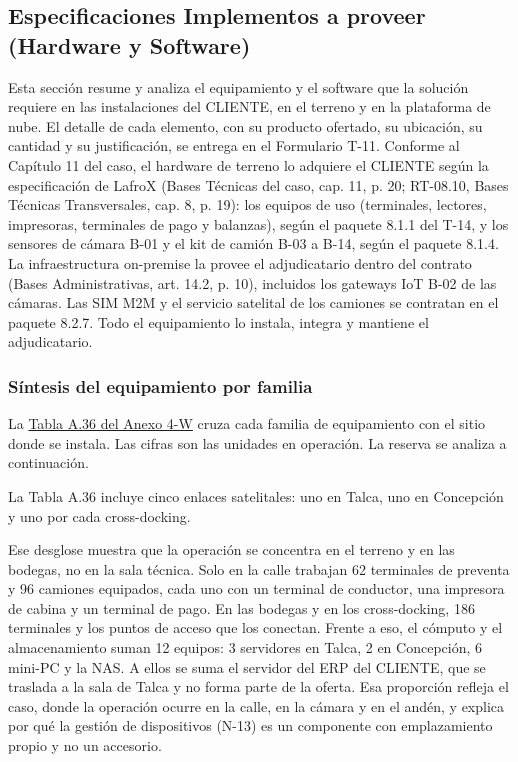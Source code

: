%

\subsection{Especificaciones Implementos a proveer (Hardware y Software)}
\label{sec:implementos}

Esta sección resume y analiza el equipamiento y el software que la solución requiere en las instalaciones del CLIENTE, en el terreno y en la plataforma de nube. El detalle de cada elemento, con su producto ofertado, su ubicación, su cantidad y su justificación, se entrega en el Formulario T-11. Conforme al Capítulo 11 del caso, el hardware de terreno lo adquiere el CLIENTE según la especificación de LafroX (Bases Técnicas del caso, cap. 11, p. 20; RT-08.10, Bases Técnicas Transversales, cap. 8, p. 19): los equipos de uso (terminales, lectores, impresoras, terminales de pago y balanzas), según el paquete 8.1.1 del T-14, y los sensores de cámara B-01 y el kit de camión B-03 a B-14, según el paquete 8.1.4. La infraestructura on-premise la provee el adjudicatario dentro del contrato (Bases Administrativas, art. 14.2, p. 10), incluidos los gateways IoT B-02 de las cámaras. Las SIM M2M y el servicio satelital de los camiones se contratan en el paquete 8.2.7. Todo el equipamiento lo instala, integra y mantiene el adjudicatario.

\subsubsection{Síntesis del equipamiento por familia}

La \href{LAFROX-Subdocumento4-Anexos.pdf#tab:t26}{Tabla A.36 del Anexo 4-W} cruza cada familia de equipamiento con el sitio donde se instala. Las cifras son las unidades en operación. La reserva se analiza a continuación.



La Tabla A.36 incluye cinco enlaces satelitales: uno en Talca, uno en Concepción y uno por cada cross-docking.

Ese desglose muestra que la operación se concentra en el terreno y en las bodegas, no en la sala técnica. Solo en la calle trabajan 62 terminales de preventa y 96 camiones equipados, cada uno con un terminal de conductor, una impresora de cabina y un terminal de pago. En las bodegas y en los cross-docking, 186 terminales y los puntos de acceso que los conectan. Frente a eso, el cómputo y el almacenamiento suman 12 equipos: 3 servidores en Talca, 2 en Concepción, 6 mini-PC y la NAS. A ellos se suma el servidor del ERP del CLIENTE, que se traslada a la sala de Talca y no forma parte de la oferta. Esa proporción refleja el caso, donde la operación ocurre en la calle, en la cámara y en el andén, y explica por qué la gestión de dispositivos (N-13) es un componente con emplazamiento propio y no un accesorio.

